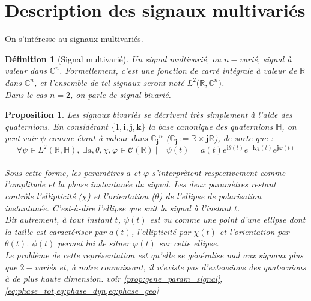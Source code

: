 \documentclass[hidelinks, french, oneside]{article}
\newcommand{\R}{\mathbb{R}}
\newcommand{\C}{\mathbb{C}}
\renewcommand{\bf}[1]{\boldsymbol{#1}}
\theoremstyle{enonce}
\newtheorem{definition}{Définition}
\newtheorem{proposition}{Proposition}
\theoremstyle{special}
\theoremstyle{rq}
\theoremstyle{exo}
\theoremstyle{demo}
\begin{document}
\setcounter{figure}{0}
\setcounter{lstlisting}{0}
\section{Description des signaux multivariés}\label{sec:bases}

On s'intéresse au signaux multivariés.
\\

\begin{definition}[Signal multivarié] 
Un \textit{signal multivarié}, ou \textit{$n-$varié}, signal à valeur dans $\C^n$. Formellement, c'est une fonction de carré intégrale à valeur de $\R$ dans $\C^n$, et l'ensemble de tel signaux seront noté $L^2\big(\R,\C^n\big)$.
\\
Dans le cas $n=2$, on parle de signal \textit{bivarié}.
\end{definition}

\begin{proposition}\label{prop:quatern}
Les signaux bivariés se décrivent très simplement à l'aide des quaternions. En considérant $\{1, \bf{i},\bf{j},\bf{k}\}$ la base canonique des quaternions $\mathbb{H}$, on peut voir $\psi$ comme étant à valeur dans ${\C_{\bf{j}}}^n$ ($\C_{\bf{j}} :=\R\times \bf{j}\R$), de sorte que :
\[\forall \psi\in L^2(\R,\mathbb{H}),\ \exists a,\theta,\chi,\varphi \in\mathcal{C}(\R)\ |\quad \psi(t) = a(t)e^{\bf{i}\theta(t)}e^{-\bf{k}\chi(t)}e^{\bf{j}\varphi(t)}\]
\\
Sous cette forme, les paramètres $a$ et $\varphi$ s'interprètent respectivement comme l'amplitude et la phase instantanée du signal. Les deux paramètres restant contrôle l'ellipticité ($\chi$) et l'orientation ($\theta$) de l’ellipse de polarisation instantanée. C'est-à-dire l'ellipse que suit la signal à l'instant $t$.
\\
Dit autrement, à tout instant $t$, $\psi(t)$ est vu comme une point d'une ellipse dont la taille est caractériser par $a(t)$, l'ellipticité par $\chi(t)$ et l'orientation par $\theta(t)$. $\phi(t)$ permet lui de situer $\varphi(t)$ sur cette ellipse.
\\

\textit{Le problème de cette représentation est qu'elle se généralise mal aux signaux plus que $2-$variés et, à notre connaissant, il n'existe pas d'extensions des quaternions à de plus haute dimension.} voir \cref{prop:gene_param_signal}, \cref{eq:phase_tot,eq:phase_dyn,eq:phase_geo} 
\end{proposition}
\end{document}
